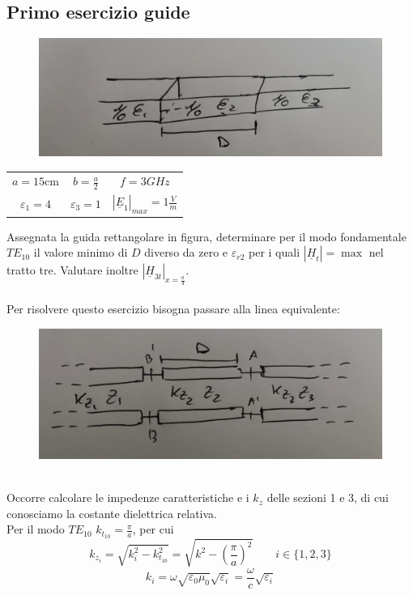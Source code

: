 \documentclass{book}
\begin{document}
    \subsection*{Primo esercizio guide}
    \begin{figure}[h!]
        \center  
        \includegraphics[width=0.65\linewidth]{img/Esercizi/Esercizi5.png}
    \end{figure}   
    \begin{tabular}{c c c}
        $a = 15\textrm{cm}$ & $b = \frac{a}{2}$ & $f=3GHz$ \\
        $\varepsilon_{1} = 4$ & $\varepsilon_{3}=1$ & $|\underline{E}_{1}|_{max}= 1 \frac{V}{m}$
    \end{tabular}
    Assegnata la guida rettangolare in figura, determinare per il modo fondamentale $TE_{10}$ il valore minimo di $D$ diverso da zero e $\varepsilon_{r2}$ per i quali
    $|\underline{H}_{t}|=\max$ nel tratto tre. Valutare inoltre $|\underline{H}_{3t}|_{x=\frac{a}{4}}$. \\ \\
    Per risolvere questo esercizio bisogna passare alla linea equivalente:
    \begin{figure}[h!]
        \center  
        \includegraphics[width=0.6\linewidth]{img/Esercizi/Esercizi6.png}
    \end{figure} \\
    Occorre calcolare le impedenze caratteristiche e i $k_{z}$ delle sezioni 1 e 3, di cui conosciamo la costante dielettrica relativa. \\
    Per il modo $TE_{10}$ $k_{t_{10}} = \frac{\pi}{a}$, per cui
    \begin{equation}
        k_{z_{i}} = \sqrt{k_{i} ^{2} - k_{t_{10}} ^{2}}= \sqrt{k^{2} - (\frac{\pi}{a})^{2}} \qquad i \in \{1, 2, 3\}
    \end{equation}
    \begin{equation}
        k_{i} = \omega \sqrt{\varepsilon_{0} \mu_{0}} \sqrt{\varepsilon_{i}} = \frac{\omega}{c}\sqrt{\varepsilon_{i}}
    \end{equation}
\end{document}
